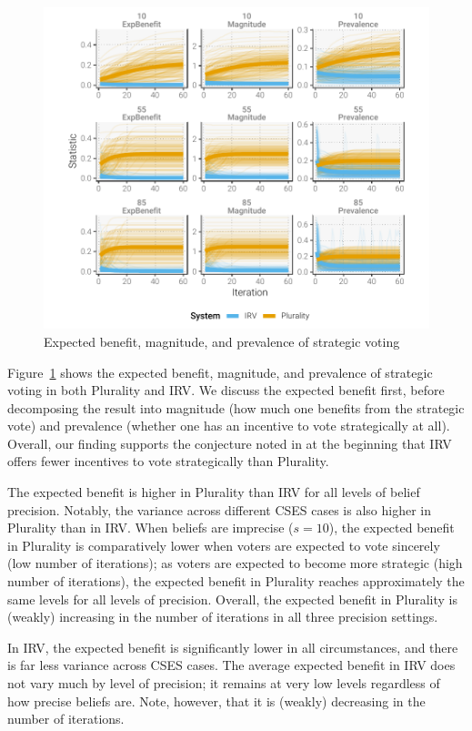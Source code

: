 \documentclass[11pt, letter]{article}
\begin{document}
\begin{figure}[]
	\centering
	\includegraphics[width = \textwidth]{../output/figures/iterated_complete}
	\caption{Expected benefit, magnitude, and prevalence of strategic voting}
	\label{fig:main_stats}
\end{figure}

Figure~\ref{fig:main_stats} shows the expected benefit, magnitude, and prevalence of strategic voting in both Plurality and IRV. We discuss the expected benefit first, before decomposing the result into magnitude (how much one benefits from the strategic vote) and prevalence (whether one has an incentive to vote strategically at all). Overall, our finding supports the conjecture noted in at the beginning that IRV offers fewer incentives to vote strategically than Plurality.

The expected benefit is higher in Plurality than IRV for all levels of belief precision. Notably, the variance across different CSES cases is also higher in Plurality than in IRV. When beliefs are imprecise ($s = 10$), the expected benefit in Plurality is comparatively lower when voters are expected to vote sincerely (low number of iterations); as voters are expected to become more strategic (high number of iterations), the expected benefit in Plurality reaches approximately the same levels for all levels of precision. Overall, the expected benefit in Plurality is (weakly) increasing in the number of iterations in all three precision settings. 

In IRV, the expected benefit is significantly lower in all circumstances, and there is far less variance across CSES cases. The average expected benefit in IRV does not vary much by level of precision; it remains at very low levels regardless of how precise beliefs are. Note, however, that it is (weakly) decreasing in the number of iterations.
\end{document}
